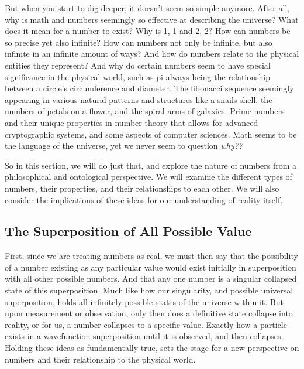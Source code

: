 \documentclass[11pt]{article}
\begin{document}
        But when you start to dig deeper, it doesn't seem so simple anymore.
        After-all, why is math and numbers seemingly so effective at describing the universe?
        What does it mean for a number to exist?
        Why is 1, 1 and 2, 2?
        How can numbers be so precise yet also infinite?
        How can numbers not only be infinite, but also infinite in an infinite amount of ways?
        And how do numbers relate to the physical entities they represent?
        And why do certain numbers seem to have special significance in the physical world, such as pi always being the relationship between a circle's circumference and diameter.
        The fibonacci sequence seemingly appearing in various natural patterns and structures like a snails shell, the numbers of petals on a flower, and the spiral arms of galaxies.
        Prime numbers and their unique properties in number theory that allows for advanced cryptographic systems, and some aspects of computer sciences.
        Math seems to be the language of the universe, yet we never seem to question \emph{why??}

        So in this section, we will do just that, and explore the nature of numbers from a philosophical and ontological perspective.
        We will examine the different types of numbers, their properties, and their relationships to each other.
        We will also consider the implications of these ideas for our understanding of reality itself.

    \subsection{The Superposition of All Possible Value}
        \hspace{1em}
        First, since we are treating numbers as real, we must then say that the possibility of a number existing as any particular value would exist initially in superposition with all other possible numbers.
        And that any one number is a singular collapsed state of this superposition.
        Much like how our singularity, and possible universal superposition, holds all infinitely possible states of the universe within it.
        But upon measurement or observation, only then does a definitive state collapse into reality, or for us, a number collapses to a specific value.
        Exactly how a particle exists in a wavefunction superposition until it is observed, and then collapses.
        Holding these ideas as fundamentally true, sets the stage for a new perspective on numbers and their relationship to the physical world.
\end{document}
